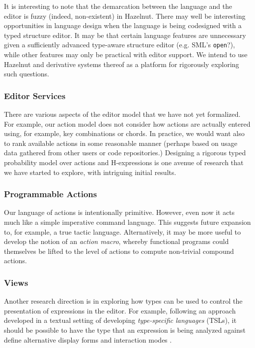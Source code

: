 \documentclass[preprint,9pt]{sigplanconf}
\begin{document}
It is interesting to note that the demarcation between the language and the editor is fuzzy (indeed, non-existent) in Hazelnut. There may well be interesting opportunities in language design when the language is being codesigned with a typed structure editor. It may be that certain language features are unnecessary given a sufficiently advanced type-aware structure editor (e.g. SML's \texttt{open}?), while other features may only be practical with editor support. We intend to use Hazelnut and derivative systems thereof as a platform for rigorously exploring such questions.

\subsubsection{Editor Services}
There are various aspects of the editor model that we have not yet formalized. For example, our action model does not consider how actions are actually entered using, for example, key combinations or chords. In practice, we would want also to rank available actions in some reasonable manner (perhaps based on usage data gathered from other users or code repositories.) Designing a rigorous typed probability model over actions and H-expressions is one avenue of research that we have started to explore, with intriguing initial results.

\subsubsection{Programmable Actions}
Our language of actions is intentionally primitive. However, even now it acts much like a simple imperative command language. This suggests future expansion to, for example, a true tactic language. Alternatively, it may be more useful to develop the notion of an \emph{action macro}, whereby functional programs could themselves be lifted to the level of actions to compute non-trivial compound actions. 

\subsubsection{Views}
Another research direction is in exploring how types can be used to control the presentation of expressions in the editor. For example, following an approach developed in a textual setting of developing \emph{type-specific languages} (TSLs), it should be possible to have the type that an expression is being analyzed against define alternative display forms and interaction modes \cite{TSLs}.
\end{document}
